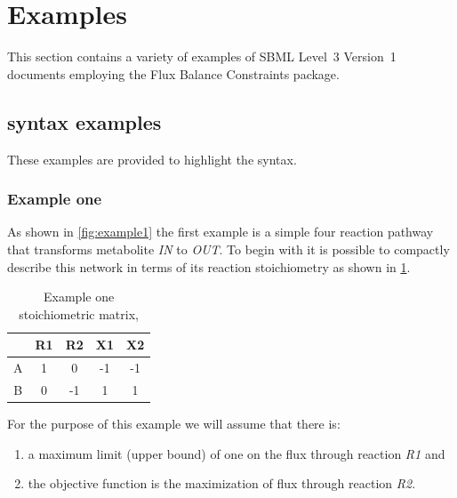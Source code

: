 
\section{Examples}
\label{examples}

This section contains a variety of examples of SBML Level~3 Version~1
documents employing the Flux Balance Constraints package.

\subsection{\FBC syntax examples}

These examples are provided to highlight the \FBCPackage syntax.

\subsubsection{Example one}

As shown in \ref{fig:example1} the first example is a simple four reaction pathway that transforms metabolite \textit{IN} to \textit{OUT}. To begin with it is possible to compactly describe this network in terms of its reaction stoichiometry as shown in \ref{tble:ex1nmat}.
\begin{table}[h]
  \centering
    \begin{tabular}{c|cccc}
          & R1 & R2 & X1 & X2 \\ \hline
        A & 1 &  0 & -1 & -1 \\
        B & 0 & -1 &  1 &  1 \\
    \end{tabular}
  \caption{Example one stoichiometric matrix, \Nmat}
  \label{tble:ex1nmat}
\end{table}


For the purpose of this example we will assume that there is:
%
\begin{enumerate}
  \item a maximum limit (upper bound) of one on the flux through reaction \textit{R1} and
  \item the objective function is the maximization of flux through reaction \textit{R2}.
\end{enumerate}

 

